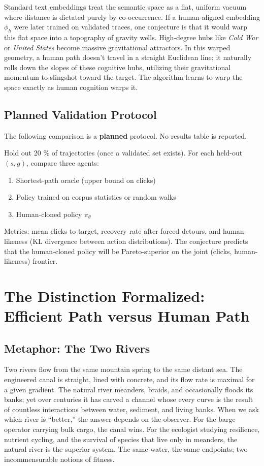 \documentclass[11pt,a4paper]{report}
\begin{document}
Standard text embeddings treat the semantic space as a flat, uniform vacuum where distance is dictated purely by co-occurrence. If a human-aligned embedding \(\phi_h\) were later trained on validated traces, one conjecture is that it would warp this flat space into a topography of gravity wells. High-degree hubs like \textit{Cold War} or \textit{United States} become massive gravitational attractors. In this warped geometry, a human path doesn't travel in a straight Euclidean line; it naturally rolls down the slopes of these cognitive hubs, utilizing their gravitational momentum to slingshot toward the target. The algorithm learns to warp the space exactly as human cognition warps it.

\section{Planned Validation Protocol}

The following comparison is a \textbf{planned} protocol. No results table is reported.

Hold out 20 \% of trajectories (once a validated set exists). For each held-out \((s, g)\), compare three agents:
\begin{enumerate}
    \item Shortest-path oracle (upper bound on clicks)
    \item Policy trained on corpus statistics or random walks
    \item Human-cloned policy \(\pi_\theta\)
\end{enumerate}
Metrics: mean clicks to target, recovery rate after forced detours, and human-likeness (KL divergence between action distributions). The conjecture predicts that the human-cloned policy will be Pareto-superior on the joint (clicks, human-likeness) frontier.

\chapter{The Distinction Formalized: Efficient Path versus Human Path}

\section{Metaphor: The Two Rivers}

Two rivers flow from the same mountain spring to the same distant sea. The engineered canal is straight, lined with concrete, and its flow rate is maximal for a given gradient. The natural river meanders, braids, and occasionally floods its banks; yet over centuries it has carved a channel whose every curve is the result of countless interactions between water, sediment, and living banks. When we ask which river is “better,” the answer depends on the observer. For the barge operator carrying bulk cargo, the canal wins. For the ecologist studying resilience, nutrient cycling, and the survival of species that live only in meanders, the natural river is the superior system. The same water, the same endpoints; two incommensurable notions of fitness.
\end{document}
